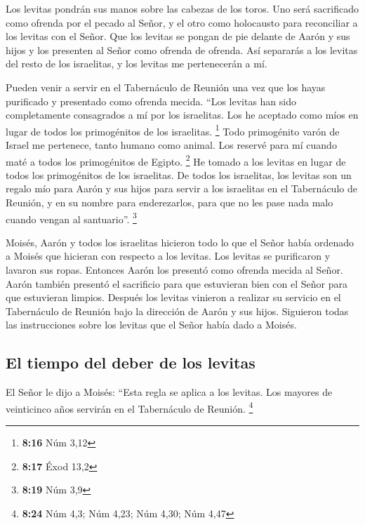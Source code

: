  Los levitas pondrán sus manos sobre las cabezas de los
toros. Uno será sacrificado como ofrenda por el pecado al Señor, y el
otro como holocausto para reconciliar a los levitas con el Señor.
 Que los levitas se pongan de pie delante de Aarón y sus
hijos y los presenten al Señor como ofrenda de ofrenda. 
Así separarás a los levitas del resto de los israelitas, y los levitas
me pertenecerán a mí.

 Pueden venir a servir en el Tabernáculo de Reunión una
vez que los hayas purificado y presentado como ofrenda mecida.
 ``Los levitas han sido completamente consagrados a mí
por los israelitas. Los he aceptado como míos en lugar de todos los
primogénitos de los israelitas. \footnote{\textbf{8:16} Núm 3,12}
 Todo primogénito varón de Israel me pertenece, tanto
humano como animal. Los reservé para mí cuando maté a todos los
primogénitos de Egipto. \footnote{\textbf{8:17} Éxod 13,2}
 He tomado a los levitas en lugar de todos los
primogénitos de los israelitas.  De todos los israelitas,
los levitas son un regalo mío para Aarón y sus hijos para servir a los
israelitas en el Tabernáculo de Reunión, y en su nombre para
enderezarlos, para que no les pase nada malo cuando vengan al
santuario''. \footnote{\textbf{8:19} Núm 3,9}

 Moisés, Aarón y todos los israelitas hicieron todo lo
que el Señor había ordenado a Moisés que hicieran con respecto a los
levitas.  Los levitas se purificaron y lavaron sus ropas.
Entonces Aarón los presentó como ofrenda mecida al Señor. Aarón también
presentó el sacrificio para que estuvieran bien con el Señor para que
estuvieran limpios.  Después los levitas vinieron a
realizar su servicio en el Tabernáculo de Reunión bajo la dirección de
Aarón y sus hijos. Siguieron todas las instrucciones sobre los levitas
que el Señor había dado a Moisés.

\hypertarget{el-tiempo-del-deber-de-los-levitas}{%
\subsection{El tiempo del deber de los
levitas}\label{el-tiempo-del-deber-de-los-levitas}}

 El Señor le dijo a Moisés:  ``Esta regla
se aplica a los levitas. Los mayores de veinticinco años servirán en el
Tabernáculo de Reunión. \footnote{\textbf{8:24} Núm 4,3; Núm 4,23; Núm
  4,30; Núm 4,47}

